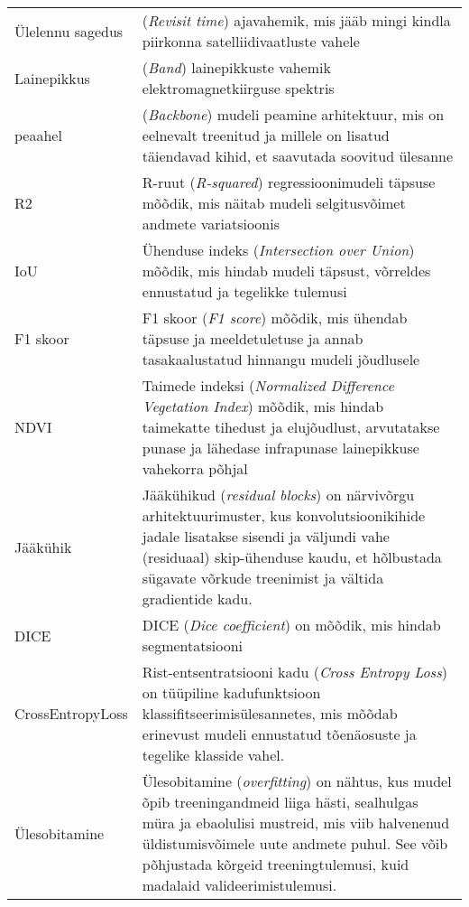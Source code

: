 \begin{longtable}{p{3cm}p{10cm}}  %
Ülelennu sagedus & (\textit{Revisit time}) ajavahemik, mis jääb mingi kindla
piirkonna satelliidivaatluste vahele\\
Lainepikkus & (\textit{Band}) lainepikkuste vahemik elektromagnetkiirguse spektris \\
peaahel & (\textit{Backbone}) mudeli peamine arhitektuur, mis on eelnevalt treenitud
ja millele on lisatud täiendavad kihid, et saavutada soovitud ülesanne\\
R2 & R-ruut (\textit{R-squared}) regressioonimudeli täpsuse mõõdik, mis näitab
mudeli selgitusvõimet andmete variatsioonis\\
IoU & Ühenduse indeks (\textit{Intersection over Union}) mõõdik, mis hindab
mudeli täpsust, võrreldes ennustatud ja tegelikke tulemusi\\
F1 skoor & F1 skoor (\textit{F1 score}) mõõdik, mis ühendab täpsuse ja
meeldetuletuse ja annab tasakaalustatud hinnangu mudeli jõudlusele\\
NDVI & Taimede indeksi (\textit{Normalized Difference Vegetation Index}) mõõdik, mis
hindab taimekatte tihedust ja elujõudlust, arvutatakse punase ja lähedase
infrapunase lainepikkuse vahekorra põhjal\\
Jääkühik & Jääkühikud (\textit{residual blocks}) on närvivõrgu arhitektuurimuster, kus konvolutsioonikihide jadale lisatakse sisendi ja väljundi vahe (residuaal) skip-ühenduse kaudu, et hõlbustada sügavate võrkude treenimist ja vältida gradientide kadu. \\
DICE & DICE (\textit{Dice coefficient}) on mõõdik, mis hindab segmentatsiooni \\
CrossEntropyLoss & Rist-entsentratsiooni kadu (\textit{Cross Entropy Loss}) on
tüüpiline kadufunktsioon klassifitseerimisülesannetes, mis mõõdab erinevust mudeli ennustatud tõenäosuste ja tegelike klasside vahel. \\
Ülesobitamine & Ülesobitamine (\textit{overfitting})  on nähtus, kus mudel õpib treeningandmeid liiga hästi, sealhulgas müra ja ebaolulisi mustreid, mis viib halvenenud üldistumisvõimele uute andmete puhul. See võib põhjustada kõrgeid treeningtulemusi, kuid madalaid valideerimistulemusi. \\
\end{longtable}
\addtocounter{table}{-1} %
